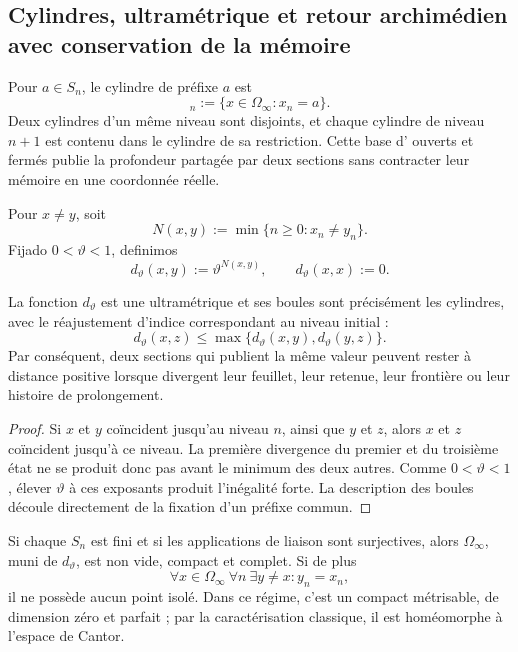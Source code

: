 \subsection{Cylindres, ultramétrique et retour archimédien avec conservation de la mémoire}

Pour \(a\in S_n\), le cylindre de préfixe \(a\) est
\begin{equation}
 [a]_n:=\{x\in\Omega_\infty:x_n=a\}.
 \label{eq:cilindro-genealogico-rev3}
\end{equation}
Deux cylindres d'un même niveau sont disjoints, et chaque cylindre de niveau
\(n+1\) est contenu dans le cylindre de sa restriction. Cette base d'
ouverts et fermés publie la profondeur partagée par deux sections sans
contracter leur mémoire en une coordonnée réelle.

Pour \(x\neq y\), soit
\[
 N(x,y):=\min\{n\geq0:x_n\neq y_n\}.
\]
Fijado \(0<\vartheta<1\), definimos
\begin{equation}
 d_\vartheta(x,y):=\vartheta^{N(x,y)},
 \qquad d_\vartheta(x,x):=0.
 \label{eq:ultrametrica-genealogica-rev3}
\end{equation}

\begin{proposition}
\label{prop:ultrametrica-genealogica-rev3}
La fonction \(d_\vartheta\) est une ultramétrique et ses boules sont précisément
les cylindres, avec le réajustement d'indice correspondant au niveau initial :
\[
 d_\vartheta(x,z)
 \leq
 \max\{d_\vartheta(x,y),d_\vartheta(y,z)\}.
\]
Par conséquent, deux sections qui publient la même valeur peuvent rester à
distance positive lorsque divergent leur feuillet, leur retenue, leur frontière ou leur
histoire de prolongement.
\end{proposition}

\begin{proof}
Si \(x\) et \(y\) coïncident jusqu'au niveau \(n\), ainsi que \(y\) et \(z\),
alors \(x\) et \(z\) coïncident jusqu'à ce niveau. La première divergence du
premier et du troisième état ne se produit donc pas avant le minimum des
deux autres. Comme \(0<\vartheta<1\), élever \(\vartheta\) à ces
exposants produit l'inégalité forte. La description des boules découle
directement de la fixation d'un préfixe commun.
\end{proof}

\begin{theorem}
\label{thm:compacidad-ultrametrica-genealogica-rev3}
Si chaque \(S_n\) est fini et si les applications de liaison sont surjectives, alors
\(\Omega_\infty\), muni de \(d_\vartheta\), est non vide, compact et complet.
Si de plus
\begin{equation}
 \forall x\in\Omega_\infty\ \forall n\ \exists y\neq x:
 y_n=x_n,
 \label{eq:perfeccion-genealogica-rev3}
\end{equation}
il ne possède aucun point isolé. Dans ce régime, c'est un compact métrisable,
de dimension zéro et parfait ; par la caractérisation classique, il est homéomorphe
à l'espace de Cantor.
\end{theorem}

